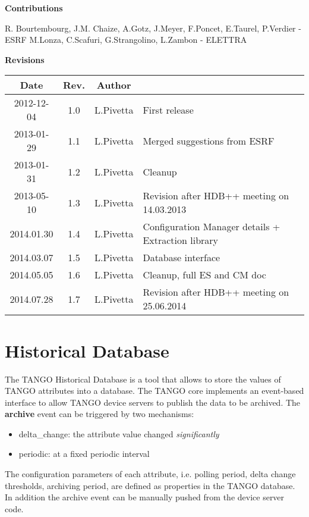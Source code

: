 \documentclass[11pt,a4paper]{article}
\def \cm{Configuration Manager}
\def \tango{TANGO}
\begin{document}
\begin{Large}
	\textbf{Contributions}
\end{Large}
\newline
R. Bourtembourg, J.M. Chaize, A.Gotz, J.Meyer, F.Poncet, E.Taurel, P.Verdier - ESRF
\newline
M.Lonza, C.Scafuri, G.Strangolino, L.Zambon - ELETTRA
\vspace{2cm}

\begin{Large}
	\textbf{Revisions}
\end{Large}
\begin{table}[!htb]
	\begin{tabular}{|c|c|c|l|}
		\hline
		\bf{Date} & \bf{Rev.} & \bf{Author} & \\
		\hline
		2012-12-04 & 1.0 & L.Pivetta & First release \\
		2013-01-29 & 1.1 & L.Pivetta & Merged suggestions from ESRF \\
		2013-01-31 & 1.2 & L.Pivetta & Cleanup \\
		2013-05-10 & 1.3 & L.Pivetta & Revision after HDB++ meeting on 14.03.2013 \\
		2014.01.30 & 1.4 & L.Pivetta & \cm{} details + Extraction library \\
		2014.03.07 & 1.5 & L.Pivetta & Database interface \\
		2014.05.05 & 1.6 & L.Pivetta & Cleanup, full ES and CM doc \\
		2014.07.28 & 1.7 & L.Pivetta & Revision after HDB++ meeting on 25.06.2014 \\
	\hline
	\end{tabular}
	\label{revisions}
\end{table}

\newpage{\clearpage}

\tableofcontents

\newpage{\clearpage}

\listoftables

\newpage{\clearpage}

\section{Historical Database}
The \tango{} Historical Database is a tool that allows to store the values
of \tango{} attributes into a database. The \tango{} core implements an
event-based interface to allow \tango{} device servers to publish the data
to be archived. The \textbf{archive} event can be triggered by two mechanisms:
\begin{itemize}
	\item delta\_change: the attribute value changed \emph{significantly}
	\item periodic: at a fixed periodic interval
\end{itemize}
The configuration parameters of each attribute, i.e. polling period, 
delta change thresholds, archiving period, are defined as properties
in the \tango{} database. In addition the archive event can be manually
pushed from the device server code.
\end{document}
